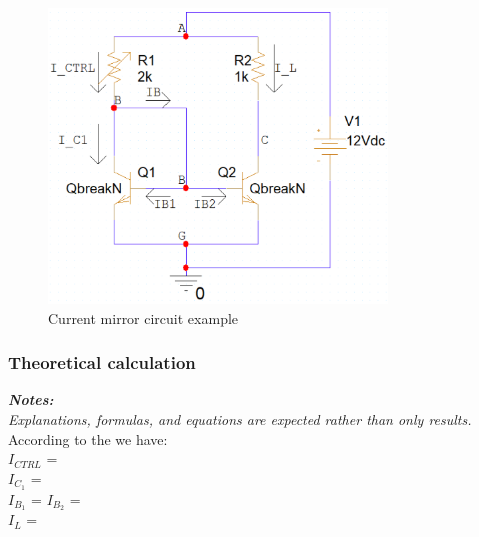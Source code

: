 \begin{figure}[H]
    \centering
    \includegraphics[width=9cm]{source/picture/bai_3/lab3_currenMirror_de.png}
    \caption{Current mirror circuit example}
    \label{lab3_currentMirror_de}
\end{figure}

\subsubsection{Theoretical calculation}
\textit{\textbf{Notes:}}\\
\textit{Explanations, formulas, and equations are expected rather than only results.}
\bigskip\\
According to the \dotfill we have: \bigskip\\
$I_{CTRL}$ = \dotfill \bigskip \\
$I_{C_1}$ = \dotfill \bigskip \\
$I_{B_1}$ = $I_{B_2}$ = \dotfill \bigskip \\
$I_L$ = \dotfill \bigskip \\

